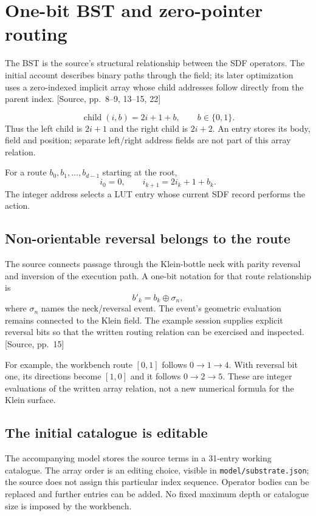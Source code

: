 \documentclass[11pt,a4paper]{article}
\newcommand{\src}[1]{{\sffamily\footnotesize\color{DWGray}[Source, pp.~#1]}}
\newcommand{\code}[1]{\texttt{#1}}
\begin{document}
\section{One-bit BST and zero-pointer routing}
The BST is the source's structural relationship between the SDF operators. The initial account describes binary paths through the field; its later optimization uses a zero-indexed implicit array whose child addresses follow directly from the parent index. \src{8--9, 13--15, 22}

\begin{equation}
\boxed{\operatorname{child}(i,b)=2i+1+b,\qquad b\in\{0,1\}.}
\end{equation}
Thus the left child is $2i+1$ and the right child is $2i+2$. An entry stores its body, field and position; separate left/right address fields are not part of this array relation.

For a route $b_0,b_1,\ldots,b_{d-1}$ starting at the root,
\begin{equation}
i_0=0,\qquad i_{k+1}=2i_k+1+b_k.
\end{equation}
The integer address selects a LUT entry whose current SDF record performs the action.

\subsection{Non-orientable reversal belongs to the route}
The source connects passage through the Klein-bottle neck with parity reversal and inversion of the execution path. A one-bit notation for that route relationship is
\begin{equation}
b'_k=b_k\oplus\sigma_n,
\end{equation}
where $\sigma_n$ names the neck/reversal event. The event's geometric evaluation remains connected to the Klein field. The example session supplies explicit reversal bits so that the written routing relation can be exercised and inspected. \src{15}

For example, the workbench route $[0,1]$ follows $0\to1\to4$. With reversal bit one, its directions become $[1,0]$ and it follows $0\to2\to5$. These are integer evaluations of the written array relation, not a new numerical formula for the Klein surface.

\subsection{The initial catalogue is editable}
The accompanying model stores the source terms in a 31-entry working catalogue. The array order is an editing choice, visible in \code{model/substrate.json}; the source does not assign this particular index sequence. Operator bodies can be replaced and further entries can be added. No fixed maximum depth or catalogue size is imposed by the workbench.
\end{document}
